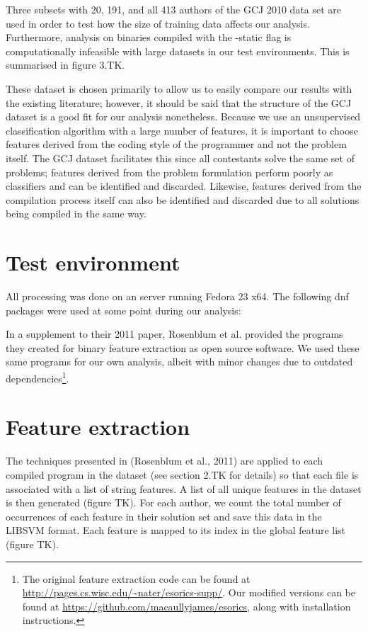\documentclass[a4paper,11pt]{kth-mag}
\begin{document}
Three subsets with 20, 191, and all 413 authors of the GCJ 2010 data set are
used in order to test how the size of training data affects our analysis.
Furthermore, analysis on binaries compiled with the -static flag is
computationally infeasible with large datasets in our test environments. This
is summarised in figure 3.TK.

These dataset is chosen primarily to allow us to easily compare our results
with the existing literature; however, it should be said that the structure of
the GCJ dataset is a good fit for our analysis nonetheless. Because we use an
unsupervised classification algorithm with a large number of features, it is
important to choose features derived from the coding style of the programmer
and not the problem itself. The GCJ dataset facilitates this since all
contestants solve the same set of problems; features derived from the problem
formulation perform poorly as classifiers and can be identified and discarded.
Likewise, features derived from the compilation process itself can also be
identified and discarded due to all solutions being compiled in the same way.

\section{Test environment}
All processing was done on an server running Fedora 23 x64. The following dnf
packages were used at some point during our analysis:

In a supplement to their 2011 paper, Rosenblum et al. provided the programs
they created for binary feature extraction as open source software. We used
these same programs for our own analysis, albeit with minor changes due to
outdated dependencies\footnote{
    The original feature extraction code can be found at
    \url{http://pages.cs.wisc.edu/~nater/esorics-supp/}. Our modified versions can be
    found at \url{https://github.com/macaullyjames/esorics}, along with installation
    instructions.
}.

\section{Feature extraction}
The techniques presented in (Rosenblum et al., 2011) are applied to each
compiled program in the dataset (see section 2.TK for details) so that each
file is associated with a list of string features. A list of all unique
features in the dataset is then generated (figure TK). For each author, we
count the total number of occurrences of each feature in their solution set and
save this data in the LIBSVM format. Each feature is mapped to its index in the
global feature list (figure TK).
\end{document}
